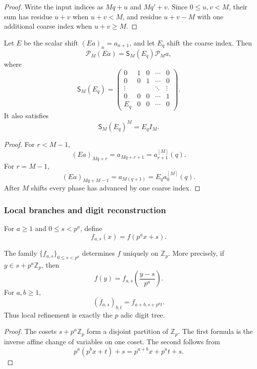 \begin{proof}
Write the input indices as \(Mq+u\) and \(Mq'+v\). Since \(0\leq u,v<M\), their sum has residue \(u+v\) when \(u+v<M\), and residue \(u+v-M\) with one additional coarse index when \(u+v\geq M\).
\end{proof}

\begin{histtheorem}\label{hist:thm:polyphase_shift_matrix}
Let \(E\) be the scalar shift \((Ea)_n=a_{n+1}\), and let \(E_q\) shift the coarse index. Then
\[
\boxed{
\mathcal P_M(Ea)
=
\mathsf S_M(E_q)\mathcal P_Ma,
}
\]
where
\[
\mathsf S_M(E_q)
=
\begin{pmatrix}
0&1&0&\cdots&0\\
0&0&1&\cdots&0\\
\vdots&&&\ddots&\vdots\\
0&0&0&\cdots&1\\
E_q&0&0&\cdots&0
\end{pmatrix}.
\]
It also satisfies
\[
\boxed{\mathsf S_M(E_q)^M=E_qI_M.}
\]
\end{histtheorem}

\begin{proof}
For \(r<M-1\),
\[
(Ea)_{Mq+r}=a_{Mq+r+1}=a_{r+1}^{[M]}(q).
\]
For \(r=M-1\),
\[
(Ea)_{Mq+M-1}=a_{M(q+1)}=E_qa_0^{[M]}(q).
\]
After \(M\) shifts every phase has advanced by one coarse index.
\end{proof}

\subsubsection{Local branches and digit reconstruction}

For \(a\geq1\) and \(0\leq s<p^a\), define
\[
f_{a,s}(x)=f(p^ax+s).
\]

\begin{histtheorem}\label{hist:thm:local_branch_reconstruction}
The family \(\{f_{a,s}\}_{0\leq s<p^a}\) determines \(f\) uniquely on \(\mathbb Z_p\). More precisely, if \(y\in s+p^a\mathbb Z_p\), then
\[
\boxed{
f(y)=f_{a,s}\left(\frac{y-s}{p^a}\right).
}
\]
For \(a,b\geq1\),
\[
\boxed{
(f_{a,s})_{b,t}
=
f_{a+b,s+p^at}.
}
\]
Thus local refinement is exactly the \(p\) adic digit tree.
\end{histtheorem}

\begin{proof}
The cosets \(s+p^a\mathbb Z_p\) form a disjoint partition of \(\mathbb Z_p\). The first formula is the inverse affine change of variables on one coset. The second follows from
\[
p^a(p^bx+t)+s
=
p^{a+b}x+p^at+s.
\]
\end{proof}

